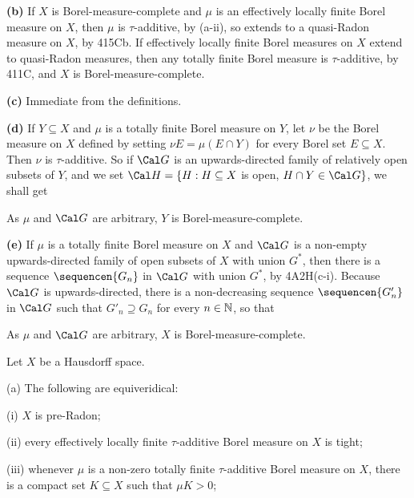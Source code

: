 {\medskip

{\bf (b)} If $X$ is
Borel-measure-complete and $\mu$ is an effectively locally finite Borel
measure on $X$, then $\mu$ is $\tau$-additive, by (a-ii), so extends to
a quasi-Radon measure on $X$, by 415Cb.   If effectively locally finite
Borel measures on $X$ extend to quasi-Radon measures, then any totally
finite Borel measure is $\tau$-additive, by 411C, and $X$ is
Borel-measure-complete.

\medskip

{\bf (c)} Immediate from the definitions.

\medskip

{\bf (d)} If $Y\subseteq X$ and $\mu$ is a totally finite Borel measure
on $Y$, let $\nu$ be the Borel measure on $X$ defined by setting
$\nu E=\mu(E\cap Y)$ for every Borel set
$E\subseteq X$.   Then $\nu$ is $\tau$-additive.
So if $\Cal G$ is an upwards-directed family of relatively open subsets
of $Y$, and we set $\Cal H=\{H:H\subseteq X$ is open, $H\cap Y\in\Cal
G\}$, we shall get


\noindent As $\mu$ and $\Cal G$ are arbitrary, $Y$ is
Borel-measure-complete.

\medskip

{\bf (e)} If $\mu$ is a totally finite Borel measure on $X$ and $\Cal G$
is a non-empty upwards-directed family of open subsets of $X$ with union
$G^*$, then there is a sequence $\sequencen{G_n}$ in $\Cal G$ with union
$G^*$, by 4A2H(c-i).   Because $\Cal G$ is upwards-directed, there is a
non-decreasing sequence $\sequencen{G'_n}$ in $\Cal G$ such that
$G'_n\supseteq G_n$ for every $n\in\Bbb N$, so that


\noindent As $\mu$ and $\Cal G$ are arbitrary, $X$ is
Borel-measure-complete.
}%

 Let $X$ be a Hausdorff space.

(a) The following are equiveridical:

\quad(i) $X$ is pre-Radon;

\quad(ii) every effectively locally finite $\tau$-additive Borel measure
on $X$ is tight;

\quad(iii) whenever $\mu$ is a non-zero totally finite
$\tau$-additive Borel measure on $X$, there is a compact set
$K\subseteq X$ such that $\mu K>0$;

